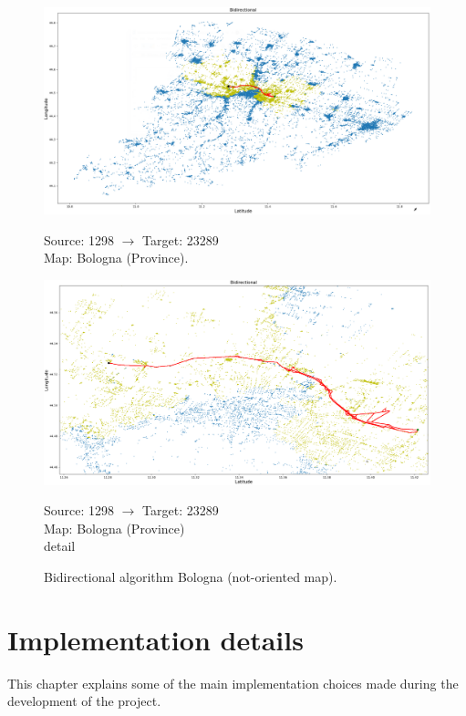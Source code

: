 \documentclass[a4paper,11pt]{report}
\begin{document}
\begin{figure}[H]
	\centering
	\begin{minipage}[b]{\textwidth}
		\includegraphics[width=\textwidth]{immaginiTest/BolognaBidir1298-23289Big.png}
		\label{fig:BolognaBidir1298-23289Big}
	\end{minipage}
	Source: 1298 $\to$ Target: 23289\\Map: Bologna (Province).
	\hfill
	\begin{minipage}[b]{\textwidth}
		\includegraphics[width=\textwidth]{immaginiTest/BolognaBidir1298-23289.png}
		\label{fig:BolognaBidir1298-23289}
	\end{minipage}
	Source: 1298 $\to$ Target: 23289\\Map: Bologna (Province)\\ detail
	\caption{Bidirectional algorithm Bologna (not-oriented map).}
\end{figure}

\chapter{Implementation details}
This chapter explains some of the main implementation choices made during the development of the project.
\end{document}
